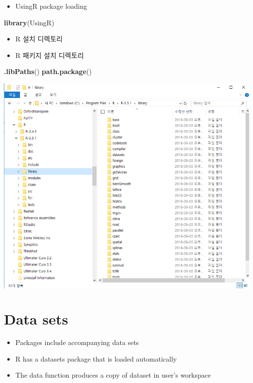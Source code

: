 \documentclass[]{book}
\newenvironment{Shaded}{\begin{snugshade}}{\end{snugshade}}
\newcommand{\KeywordTok}[1]{\textcolor[rgb]{0.13,0.29,0.53}{\textbf{#1}}}
\newcommand{\NormalTok}[1]{#1}
\providecommand{\tightlist}{%
  \setlength{\itemsep}{0pt}\setlength{\parskip}{0pt}}
\begin{document}
\begin{itemize}
\tightlist
\item
  UsingR package loading
\end{itemize}

\begin{Shaded}
\begin{Highlighting}[]
\KeywordTok{library}\NormalTok{(UsingR)}
\end{Highlighting}
\end{Shaded}

\begin{itemize}
\tightlist
\item
  R 설치 디렉토리
\item
  R 패키지 설치 디렉토리
\end{itemize}

\begin{Shaded}
\begin{Highlighting}[]
\KeywordTok{.libPaths}\NormalTok{()}
\KeywordTok{path.package}\NormalTok{()}
\end{Highlighting}
\end{Shaded}

\includegraphics{images/01-20.png}

\hypertarget{data-sets}{%
\section{Data sets}\label{data-sets}}

\begin{itemize}
\tightlist
\item
  Packages include accompanying data sets
\item
  R has a datasets package that is loaded automatically
\item
  The data function produces a copy of dataset in user's workspace
\end{itemize}
\end{document}
